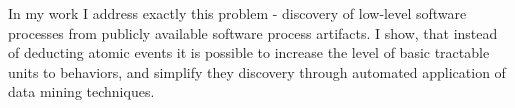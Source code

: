 In my work I address exactly this problem - discovery of low-level software processes from publicly available 
software process artifacts. I show, that instead of deducting atomic events it is possible to increase the level of 
basic tractable units to behaviors, and simplify they discovery through automated application of data mining techniques.





